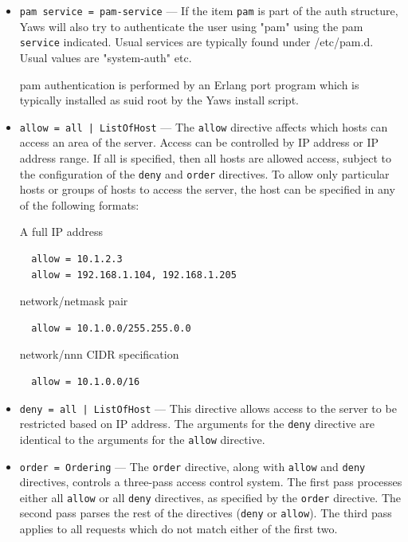 \documentclass[11pt,oneside,english]{book}
\begin{document}
\begin{itemize}
\begin{itemize}
              \item \verb+pam service = pam-service+ --- If the item \verb+pam+
                is part of the auth structure, Yaws will also try to
                authenticate the user using "pam" using the pam \verb+service+
                indicated. Usual services are typically found under
                /etc/pam.d. Usual values are "system-auth" etc.

                pam authentication is performed by an Erlang port program which
                is typically installed as suid root by the Yaws install script.

              \item \verb+allow = all | ListOfHost+ --- The \verb+allow+
                directive affects which hosts can access an area of the
                server. Access can be controlled by IP address or IP address
                range. If all is specified, then all hosts are allowed access,
                subject to the configuration of the \verb+deny+ and \verb+order+
                directives. To allow only particular hosts or groups of hosts to
                access the server, the host can be specified in any of the
                following formats:

                A full IP address
\begin{verbatim}
  allow = 10.1.2.3
  allow = 192.168.1.104, 192.168.1.205
\end{verbatim}
                network/netmask pair
\begin{verbatim}
  allow = 10.1.0.0/255.255.0.0
\end{verbatim}
                network/nnn CIDR specification
\begin{verbatim}
  allow = 10.1.0.0/16
\end{verbatim}

              \item \verb+deny = all | ListOfHost+ --- This directive allows
                access to the server to be restricted based on IP address. The
                arguments for the \verb+deny+ directive are identical to the
                arguments for the \verb+allow+ directive.

              \item \verb+order = Ordering+ --- The \verb+order+ directive,
                along with \verb+allow+ and \verb+deny+ directives, controls a
                three-pass access control system. The first pass processes
                either all \verb+allow+ or all \verb+deny+ directives, as
                specified by the \verb+order+ directive. The second pass parses
                the rest of the directives (\verb+deny+ or \verb+allow+). The
                third pass applies to all requests which do not match either of
                the first two.


\end{itemize}
\end{itemize}
\end{document}
